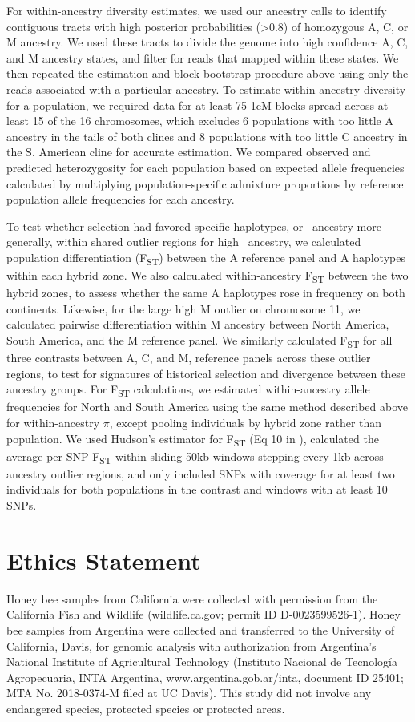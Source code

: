 For within-ancestry diversity estimates, we used our ancestry calls to identify contiguous tracts with high posterior probabilities (\textgreater 0.8) of homozygous A, C, or M ancestry. We used these tracts to divide the genome into high confidence A, C, and M ancestry states, and filter for reads that mapped within these states. We then repeated the estimation and block bootstrap procedure above using only the reads associated with a particular ancestry. To estimate within-ancestry diversity for a population, we required data for at least 75 1cM blocks spread across at least 15 of the 16 chromosomes, which excludes 6 populations with too little A ancestry in the tails of both clines and 8 populations with too little C ancestry in the S. American cline for accurate estimation. We compared observed and predicted heterozygosity for each population based on expected allele frequencies calculated by multiplying population-specific admixture proportions by reference population allele frequencies for each ancestry.

To test whether selection had favored specific haplotypes, or \scutellata\ ancestry more generally, within shared outlier regions for high \A\ ancestry, we calculated population differentiation (F\textsubscript{ST}) between the A reference panel and A haplotypes within each hybrid zone. We also calculated within-ancestry F\textsubscript{ST} between the two hybrid zones, to assess whether the same A haplotypes rose in frequency on both continents. Likewise, for the large high M outlier on chromosome 11, we calculated pairwise differentiation within M ancestry between North America, South America, and the M reference panel. We similarly calculated F\textsubscript{ST} for all three contrasts between A, C, and M, reference panels across these outlier regions, to test for signatures of historical selection and divergence between these ancestry groups.
For F\textsubscript{ST} calculations, we estimated within-ancestry allele frequencies for North and South America using the same method described above for within-ancestry $\pi$, except pooling individuals by hybrid zone rather than population. We used Hudson's estimator for F\textsubscript{ST} (Eq 10 in \cite{Bhatia:2013im}), calculated the average per-SNP F\textsubscript{ST} within sliding 50kb windows stepping every 1kb across ancestry outlier regions, and only included SNPs with coverage for at least two individuals for both populations in the contrast and windows with at least 10 SNPs.

\section*{Ethics Statement}
Honey bee samples from California were collected with permission from the California Fish and Wildlife (wildlife.ca.gov; permit ID D-0023599526-1). Honey bee samples from Argentina were collected and transferred to the University of California, Davis, for genomic analysis with authorization from Argentina’s National Institute of Agricultural Technology (Instituto Nacional de Tecnología Agropecuaria, INTA Argentina, www.argentina.gob.ar/inta, document ID 25401; MTA No. 2018-0374-M filed at UC Davis). This study did not involve any endangered species, protected species or protected areas.

